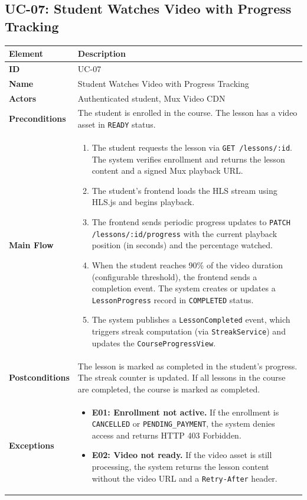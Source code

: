\subsection{UC-07: Student Watches Video with Progress Tracking}

\begin{longtable}{p{3cm}p{10cm}}
  \toprule
  \textbf{Element} & \textbf{Description} \\
  \midrule
  \endhead
  \midrule
  \endfoot
  \textbf{ID} & UC-07 \\
  \textbf{Name} & Student Watches Video with Progress Tracking \\
  \textbf{Actors} & Authenticated student, Mux Video CDN \\
  \textbf{Preconditions} & The student is enrolled in the course. The lesson has a video asset in \texttt{READY} status. \\
  \textbf{Main Flow} &
  \begin{enumerate}
    \item The student requests the lesson via \texttt{GET /lessons/:id}. The system verifies enrollment and returns the lesson content and a signed Mux playback URL.
    \item The student's frontend loads the HLS stream using HLS.js and begins playback.
    \item The frontend sends periodic progress updates to \texttt{PATCH /lessons/:id/progress} with the current playback position (in seconds) and the percentage watched.
    \item When the student reaches 90\% of the video duration (configurable threshold), the frontend sends a completion event. The system creates or updates a \texttt{LessonProgress} record in \texttt{COMPLETED} status.
    \item The system publishes a \texttt{LessonCompleted} event, which triggers streak computation (via \texttt{StreakService}) and updates the \texttt{CourseProgressView}.
  \end{enumerate} \\
  \textbf{Postconditions} & The lesson is marked as completed in the student's progress. The streak counter is updated. If all lessons in the course are completed, the course is marked as completed. \\
  \textbf{Exceptions} &
  \begin{itemize}
    \item \textbf{E01: Enrollment not active.} If the enrollment is \texttt{CANCELLED} or \texttt{PENDING\_PAYMENT}, the system denies access and returns HTTP 403 Forbidden.
    \item \textbf{E02: Video not ready.} If the video asset is still processing, the system returns the lesson content without the video URL and a \texttt{Retry-After} header.
  \end{itemize} \\
  \bottomrule
\end{longtable}

